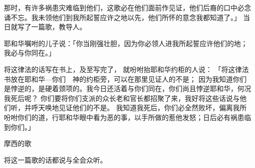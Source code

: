 {那时，有许多祸患灾难临到他们，这歌必在他们面前作见证，他们后裔的口中必念诵不忘。我未领他们到我所起誓应许之地以先，他们所怀的意念我都知道了。」
当日{}就写了一篇歌，教导{}人。
\par }{\PP {}耶和华嘱咐{}的儿子{}说：「你当刚强壮胆，因为你必领{}人进我所起誓应许他们的地；我必与你同在。」
\par }{\PP {}将这律法的话写在书上，及至写完了，
就吩咐抬耶和华约柜的{}人说：
「将这律法书放在耶和华—你们　神的约柜旁，可以在那里见证{}人的不是；
因为我知道你们是悖逆的，是硬着颈项的。我今日还活着与你们同在，你们尚且悖逆耶和华，何况我死后呢？
你们要将你们支派的众长老和官长都招聚了来，我好将这些话说与他们听，并呼天唤地见证他们的不是。
我知道我死后，你们必全然败坏，偏离我所吩咐你们的道，行耶和华眼中看为恶的事，以手所做的惹他发怒；日后必有祸患临到你们。」
\par }{\SH 摩西的歌
\par }{\PP {}将这一篇歌的话都说与{}全会众听。

}
